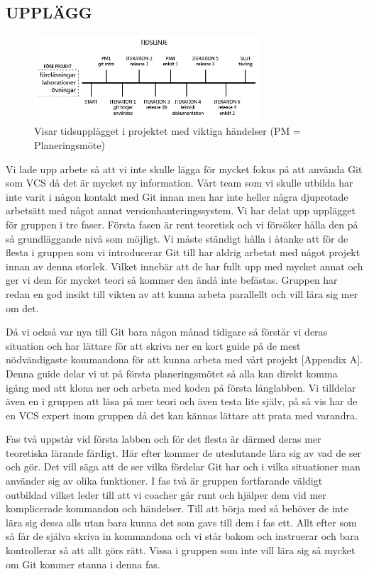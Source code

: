 \subsection{UPPLÄGG}
\label{Upplagg}

\begin{figure}[htb!]\centering\includegraphics[width=0.75\textwidth]{Tidslinje.png}\caption{Visar tidsupplägget i projektet med viktiga händelser (PM = Planeringsmöte)}\label{fig:Timeline}\end{figure}

Vi lade upp arbete så att vi inte skulle lägga för mycket fokus på att använda Git som VCS då det är mycket ny information. Vårt team som vi skulle utbilda har inte varit i någon kontakt med Git innan men har inte heller några djuprotade arbetsätt med något annat versionhanteringssystem. Vi har delat upp upplägget för gruppen i tre faser. Första fasen är rent teoretisk och vi försöker hålla den på så grundläggande nivå som möjligt. Vi måste ständigt hålla i åtanke att för de flesta i gruppen som vi introducerar Git till har aldrig arbetat med något projekt innan av denna storlek. Vilket innebär att de har fullt upp med mycket annat och ger vi dem för mycket teori så kommer den ändå inte befästas. Gruppen har redan en god insikt till vikten av att kunna arbeta parallellt och vill lära sig mer om det. 

Då vi också var nya till Git bara någon månad tidigare så förstår vi deras situation och har lättare för att skriva ner en kort guide på de mest nödvändigaste kommandona för att kunna arbeta med vårt projekt [Appendix A]. Denna guide delar vi ut på första planeringsmötet så alla kan direkt komma igång med att klona ner och arbeta med koden på första långlabben. Vi tilldelar även en i gruppen att läsa på mer teori och även testa lite själv, på så vis har de en VCS expert inom gruppen då det kan kännas lättare att prata med varandra.
 
Fas två uppstår vid första labben och för det flesta är därmed deras mer teoretiska lärande färdigt. Här efter kommer de uteslutande lära sig av vad de ser och gör. Det vill säga att de ser vilka fördelar Git har och i vilka situationer man använder sig av olika funktioner. I fas två är gruppen fortfarande väldigt outbildad vilket leder till att vi coacher går runt och hjälper dem vid mer komplicerade kommandon och händelser. Till att börja med så behöver de inte lära sig dessa alls utan bara kunna det som gavs till dem i fas ett. Allt efter som så får de själva skriva in kommandona och vi står bakom och instruerar och bara kontrollerar så att allt görs rätt. Vissa i gruppen som inte vill lära sig så mycket om Git kommer stanna i denna fas.

